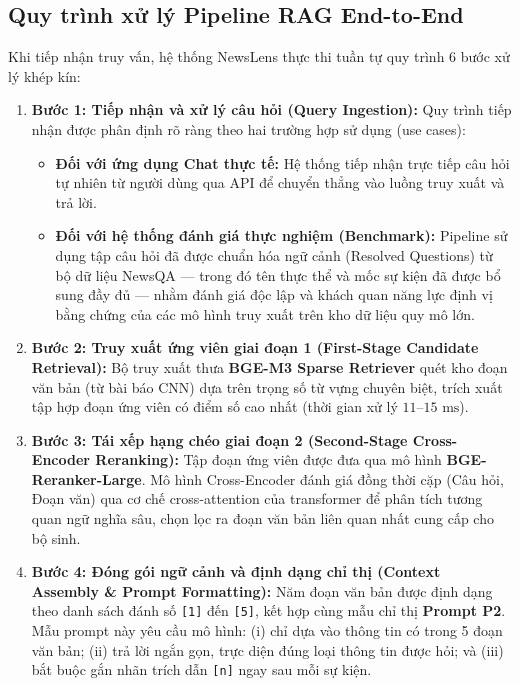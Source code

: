 \subsection{Quy trình xử lý Pipeline RAG End-to-End}

Khi tiếp nhận truy vấn, hệ thống NewsLens thực thi tuần tự quy trình 6 bước xử lý khép kín:

\begin{enumerate}
  \item \textbf{Bước 1: Tiếp nhận và xử lý câu hỏi (Query Ingestion):}
  Quy trình tiếp nhận được phân định rõ ràng theo hai trường hợp sử dụng (use cases):
  \begin{itemize}
    \item \textbf{Đối với ứng dụng Chat thực tế:} Hệ thống tiếp nhận trực tiếp câu hỏi tự nhiên từ người dùng qua API để chuyển thẳng vào luồng truy xuất và trả lời.
    \item \textbf{Đối với hệ thống đánh giá thực nghiệm (Benchmark):} Pipeline sử dụng tập câu hỏi đã được chuẩn hóa ngữ cảnh (Resolved Questions) từ bộ dữ liệu NewsQA ---
trong đó tên thực thể và mốc sự kiện đã được bổ sung đầy đủ --- nhằm đánh giá độc lập và khách quan năng lực định vị bằng chứng của các mô hình truy xuất trên kho dữ liệu
quy mô lớn.
  \end{itemize}  
  \item \textbf{Bước 2: Truy xuất ứng viên giai đoạn 1 (First-Stage Candidate Retrieval):}
  Bộ truy xuất thưa \textbf{BGE-M3 Sparse Retriever} quét kho \NumCorpusChunks{} đoạn văn bản (từ \NumCorpusArticles{} bài báo CNN) dựa trên trọng số từ vựng chuyên biệt, trích xuất tập hợp \NumPoneTopK{} đoạn ứng viên có điểm số cao nhất (thời gian xử lý $11\text{--}15\text{ ms}$).

  \item \textbf{Bước 3: Tái xếp hạng chéo giai đoạn 2 (Second-Stage Cross-Encoder Reranking):}
  Tập \NumPoneTopK{} đoạn ứng viên được đưa qua mô hình \textbf{BGE-Reranker-Large}. Mô hình Cross-Encoder đánh giá đồng thời cặp (Câu hỏi, Đoạn văn) qua cơ chế cross-attention của transformer để phân tích tương quan ngữ nghĩa sâu, chọn lọc ra \NumPoneRerankTopN{} đoạn văn bản liên quan nhất cung cấp cho bộ sinh.

  \item \textbf{Bước 4: Đóng gói ngữ cảnh và định dạng chỉ thị (Context Assembly \& Prompt Formatting):}
  Năm đoạn văn bản được định dạng theo danh sách đánh số \texttt{[1]} đến \texttt{[5]}, kết hợp cùng mẫu chỉ thị \textbf{Prompt P2}. Mẫu prompt này yêu cầu mô hình: (i) chỉ dựa vào thông tin có trong 5 đoạn văn bản; (ii) trả lời ngắn gọn, trực diện đúng loại thông tin được hỏi; và (iii) bắt buộc gắn nhãn trích dẫn \texttt{[n]} ngay sau mỗi sự kiện.


\end{enumerate}
